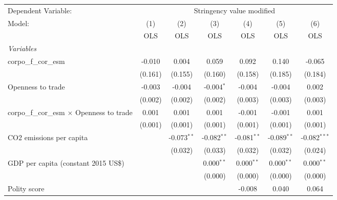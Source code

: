 
\begingroup
\centering
\begin{tabular}{lcccccc}
   \toprule
   Dependent Variable: & \multicolumn{6}{c}{Stringency value modified}\\
   Model:                                            & (1)     & (2)           & (3)           & (4)           & (5)           & (6)\\  
                                                     &  OLS    & OLS           & OLS           & OLS           & OLS           & OLS\\  
   \midrule
   \emph{Variables}\\
   corpo\_f\_cor\_esm                                & -0.010  & 0.004         & 0.059         & 0.092         & 0.140         & -0.065\\   
                                                     & (0.161) & (0.155)       & (0.160)       & (0.158)       & (0.185)       & (0.184)\\   
   Openness to trade                                 & -0.003  & -0.004        & -0.004$^{*}$  & -0.004        & -0.004        & 0.002\\   
                                                     & (0.002) & (0.002)       & (0.002)       & (0.003)       & (0.003)       & (0.003)\\   
   corpo\_f\_cor\_esm $\times$ Openness to trade     & 0.001   & 0.001         & 0.001         & -0.001        & -0.001        & 0.001\\   
                                                     & (0.001) & (0.001)       & (0.001)       & (0.001)       & (0.001)       & (0.001)\\   
   CO2 emissions per capita                          &         & -0.073$^{**}$ & -0.082$^{**}$ & -0.081$^{**}$ & -0.089$^{**}$ & -0.082$^{***}$\\   
                                                     &         & (0.032)       & (0.033)       & (0.032)       & (0.032)       & (0.024)\\   
   GDP per capita (constant 2015 US\$)               &         &               & 0.000$^{**}$  & 0.000$^{**}$  & 0.000$^{**}$  & 0.000$^{**}$\\   
                                                     &         &               & (0.000)       & (0.000)       & (0.000)       & (0.000)\\   
   Polity score                                      &         &               &               & -0.008        & 0.040         & 0.064\\   

\end{tabular}
